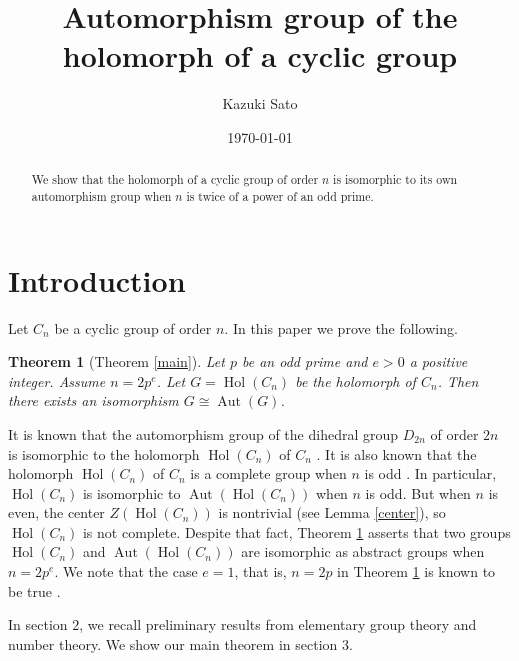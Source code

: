 \documentclass{amsart}
\newtheorem{thm}{Theorem}[section]
\begin{document}
\title{Automorphism group of the holomorph of a cyclic group}
\author{Kazuki Sato}
\begin{abstract}
We show that the holomorph of a cyclic group of order $n$ is isomorphic to its own automorphism group when $n$ is twice of a power of an odd prime.
\end{abstract}
\date{\today}
\address{National Institute of Technology, Ichinoseki College, Japan}
\maketitle

\section{Introduction}
Let $C_n$ be a cyclic group of order $n$.
In this paper we prove the following.

\begin{thm}[{Theorem \ref{main}}]\label{intromain}
Let $p$ be an odd prime and $e>0$ a positive integer.
Assume $n=2p^e$.  
Let $G=\operatorname{Hol}(C_n)$ be the holomorph of $C_n$.
Then there exists an isomorphism $G \cong \operatorname{Aut}(G)$. 
\end{thm}

It is known that the automorphism group of the dihedral group $D_{2n}$ of order $2n$ is isomorphic to the holomorph $\operatorname{Hol}(C_n)$ of $C_n$ \cite{walls}.  
It is also known that the holomorph $\operatorname{Hol}(C_n)$ of $C_n$ is a complete group when $n$ is odd \cite{miller}.
In particular, $\operatorname{Hol}(C_n)$ is isomorphic to $\operatorname{Aut}(\operatorname{Hol}(C_n))$ when $n$ is odd.
But when $n$ is even, the center $Z(\operatorname{Hol}(C_n))$ is nontrivial (see Lemma \ref{center}), so $\operatorname{Hol}(C_n)$ is not complete.
Despite that fact, Theorem \ref{intromain} asserts that two groups $\operatorname{Hol}(C_n)$ and 
$\operatorname{Aut}(\operatorname{Hol}(C_n))$ are isomorphic as abstract groups when $n=2p^e$.
We note that the case $e=1$, that is, $n=2p$ in Theorem \ref{intromain}
is known to be true \cite[Theorem 2.10]{svb}.

In section $2$, we recall preliminary results from elementary group theory and number theory.
We show our main theorem in section $3$.
\end{document}
